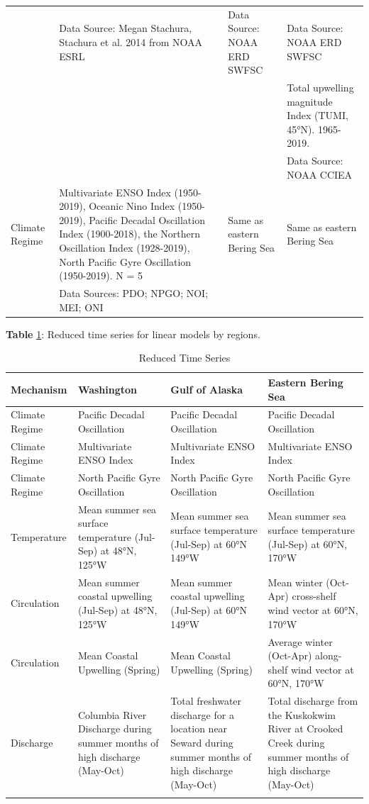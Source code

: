 \documentclass [11pt, proquest] {uwthesis}[2015/03/03]
\begin{document}
\begin{landscape}
\begin{longtable}[t]{l>{\raggedright\arraybackslash}p{20em}>{\raggedright\arraybackslash}p{20em}>{\raggedright\arraybackslash}p{20em}}
\addlinespace
 & Data Source: Megan Stachura, Stachura et al. 2014 from NOAA ESRL & Data Source: NOAA ERD SWFSC & Data Source: NOAA ERD SWFSC\\
 &  &  & Total upwelling magnitude Index (TUMI, 45°N). 1965-2019.\\
 &  &  & Data Source: NOAA CCIEA\\
Climate Regime & Multivariate ENSO Index (1950-2019), Oceanic Nino Index (1950-2019), Pacific Decadal Oscillation Index (1900-2018), the Northern Oscillation Index (1928-2019), North Pacific Gyre Oscillation (1950-2019). N = 5 & Same as eastern Bering Sea & Same as eastern Bering Sea\\
 & Data Sources: PDO; NPGO; NOI; MEI; ONI &  & \\
\bottomrule
\end{longtable}
\endgroup{}
\end{landscape}
\textbf{Table} \ref{tab:reduced}: Reduced time series for linear models by regions.

\begingroup\fontsize{8}{10}\selectfont
\begin{longtable}[t]{l>{\raggedright\arraybackslash}p{15em}>{\raggedright\arraybackslash}p{15em}>{\raggedright\arraybackslash}p{15em}}
\caption{\label{tab:reduced}Reduced Time Series}\\
\toprule
Mechanism & Washington & Gulf of Alaska & Eastern Bering Sea\\
\midrule
Climate Regime & Pacific Decadal Oscillation & Pacific Decadal Oscillation & Pacific Decadal Oscillation\\
Climate Regime & Multivariate ENSO Index & Multivariate ENSO Index & Multivariate ENSO Index\\
Climate Regime & North Pacific Gyre Oscillation & North Pacific Gyre Oscillation & North Pacific Gyre Oscillation\\
Temperature & Mean summer sea surface temperature (Jul-Sep) at 48°N, 125°W & Mean summer sea surface temperature (Jul-Sep) at 60°N 149°W & Mean summer sea surface temperature (Jul-Sep) at 60°N, 170°W\\
Circulation & Mean summer coastal upwelling (Jul-Sep) at 48°N, 125°W & Mean summer coastal upwelling (Jul-Sep) at 60°N 149°W & Mean winter (Oct-Apr) cross-shelf wind vector at 60°N, 170°W\\
\addlinespace
Circulation & Mean Coastal Upwelling (Spring) & Mean Coastal Upwelling (Spring) & Average winter (Oct-Apr) along-shelf wind vector at 60°N, 170°W\\
Discharge & Columbia River Discharge during summer months of high discharge (May-Oct) & Total freshwater discharge for a location near Seward during summer months of high discharge (May-Oct) & Total discharge from the Kuskokwim River at Crooked Creek during summer months of high discharge (May-Oct)\\
 &  &  & \\
\bottomrule
\end{longtable}
\endgroup{}
\end{document}
